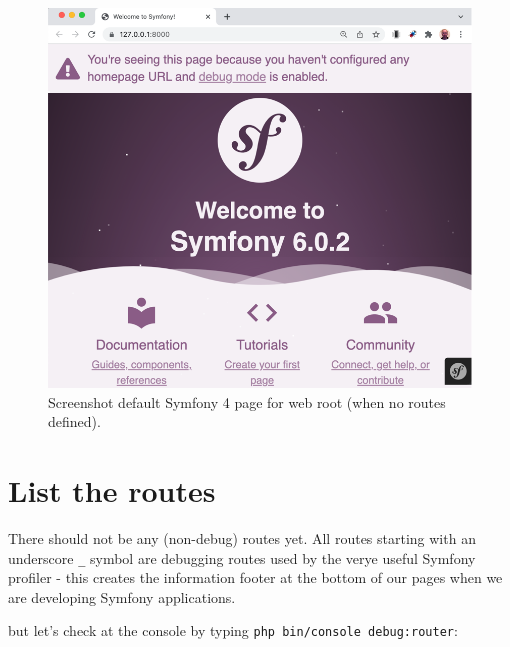 \documentclass[a4paperpaper,openright]{book}
\begin{document}
\begin{figure}
\centering
\includegraphics{./tex2pdf.-8aed53dcd332a606/83dc77bed0b03688dede533c9199414a6f4f3cce.png}
\caption{Screenshot default Symfony 4 page for web root (when no routes
defined). \label{default_page}}
\end{figure}

\hypertarget{list-the-routes}{%
\section{List the routes}\label{list-the-routes}}

There should not be any (non-debug) routes yet. All routes starting with
an underscore \texttt{\_} symbol are debugging routes used by the verye
useful Symfony profiler - this creates the information footer at the
bottom of our pages when we are developing Symfony applications.

but let's check at the console by typing
\texttt{php\ bin/console\ debug:router}:
\end{document}
